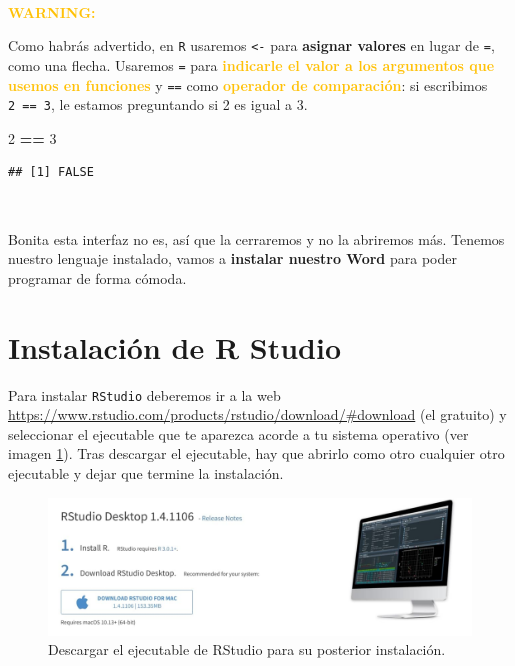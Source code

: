 \documentclass[11pt,]{book}
\newenvironment{Shaded}{\begin{snugshade}}{\end{snugshade}}
\newcommand{\DecValTok}[1]{\textcolor[rgb]{0.06,0.06,0.06}{#1}}
\newcommand{\OperatorTok}[1]{\textcolor[rgb]{0.43,0.43,0.43}{\textbf{#1}}}
\newcommand{\StringTok}[1]{\textcolor[rgb]{0.5,0.5,0.5}{#1}}
\begin{document}
~

\textbf{\textcolor{#ffc107}{WARNING: }}

Como habrás advertido, en \texttt{R} usaremos \texttt{\textless{}-} para \textbf{asignar valores} en lugar de \texttt{=}, como una flecha. Usaremos \texttt{=} para \textbf{\textcolor{#ffc107}{indicarle el valor a los argumentos que usemos en funciones}} y \texttt{==} como \textbf{\textcolor{#ffc107}{operador de comparación}}: si escribimos \texttt{2\ ==\ 3}, le estamos preguntando si 2 es igual a 3.

\begin{Shaded}
\begin{Highlighting}[]
\DecValTok{2} \OperatorTok{==}\StringTok{ }\DecValTok{3}
\end{Highlighting}
\end{Shaded}

\begin{verbatim}
## [1] FALSE
\end{verbatim}

~

Bonita esta interfaz no es, así que la cerraremos y no la abriremos más. Tenemos nuestro lenguaje instalado, vamos a \textbf{instalar nuestro Word} para poder programar de forma cómoda.

\hypertarget{instalacionRStudio}{%
\section{Instalación de R Studio}\label{instalacionRStudio}}

Para instalar \texttt{RStudio} deberemos ir a la web \url{https://www.rstudio.com/products/rstudio/download/\#download} (el gratuito) y seleccionar el ejecutable que te aparezca acorde a tu sistema operativo (ver imagen \ref{fig:pantalla-rstudio}). Tras descargar el ejecutable, hay que abrirlo como otro cualquier otro ejecutable y dejar que termine la instalación.

\begin{figure}

{\centering \includegraphics[width=0.7\linewidth]{./img/pantalla_rstudio} 

}

\caption{Descargar el ejecutable de RStudio para su posterior instalación.}\label{fig:pantalla-rstudio}
\end{figure}
\end{document}
